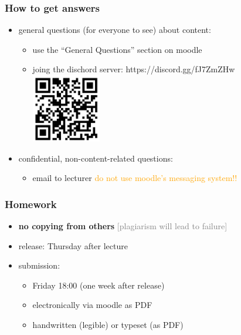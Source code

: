 \documentclass[fleqn,10pt,serif,xcolor=svgnames,xcolor=table,aspectratio=169,handout]{beamer}
\newcommand{\mycom}[1]{\hfill {\mygray{[#1]}}}
\newcommand{\mygray}[1]{\textcolor{gray}{#1}}
\begin{document}
\begin{frame}
  \frametitle{How to get answers}
  \begin{itemize}
    \item general questions (for everyone to see) about content:
    \begin{itemize}
      \item use the ``General Questions'' section on moodle
    \item joing the dischord server: https://discord.gg/fJ7ZmZHw \\
    \includegraphics[width=0.25\textwidth]{00-introduction-pics/qr-code.png}
    \end{itemize}
    \item confidential, non-content-related questions:
    \begin{itemize}
      \item email to lecturer \hfill \textcolor{orange}{do not use moodle's messaging system!!}
    \end{itemize}
  \end{itemize}
\end{frame}

\begin{frame}
  \frametitle{Homework}
  \begin{itemize}
    \item \textbf{no copying from others} \hfill \mycom{plagiarism will lead to failure}
    \item release: Thursday after lecture
    \item submission:
    \begin{itemize}
      \item Friday 18:00 (one week after release)
      \item electronically via moodle as PDF
      \item handwritten (legible) or typeset (as PDF)
    \end{itemize}
  \end{itemize}
\end{frame}
\end{document}
